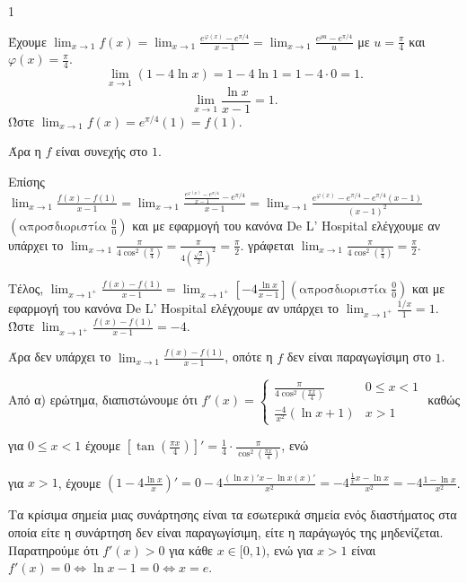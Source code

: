 \begin{ylh}{1}
    \item [Ύλη από εικόνα]
\end{ylh}

\begin{alist}
\item Έχουμε $\lim_{x \to 1} f(x) = \lim_{x \to 1} \frac{e^{\varphi(x)} - e^{\pi/4}}{x-1} = \lim_{x \to 1} \frac{e^{\rho u} - e^{\pi/4}}{u}$ με $u = \frac{\pi}{4}$ και $\varphi(x) = \frac{\pi}{4}$.
\[
\lim_{x \to 1} (1-4\ln x) = 1-4\ln 1 = 1-4\cdot 0 = 1.
\]
\[
\lim_{x \to 1} \frac{\ln x}{x-1} = 1.
\]
Ώστε $\lim_{x \to 1} f(x) = e^{\pi/4} (1) = f(1)$.

Άρα η $f$ είναι συνεχής στο $1$.

Επίσης $\lim_{x \to 1} \frac{f(x)-f(1)}{x-1} = \lim_{x \to 1} \frac{\frac{e^{\varphi(x)}-e^{\pi/4}}{x-1} - e^{\pi/4}}{x-1} = \lim_{x \to 1} \frac{e^{\varphi(x)}-e^{\pi/4} - e^{\pi/4}(x-1)}{(x-1)^2}$
$\left( \text{απροσδιοριστία } \frac{0}{0} \right)$ και με εφαρμογή του κανόνα De L' Hospital ελέγχουμε αν υπάρχει το $\lim_{x \to 1} \frac{\pi}{4 \cos^2 (\frac{\pi}{4})} = \frac{\pi}{4 (\frac{\sqrt{2}}{2})^2} = \frac{\pi}{2}$.
γράφεται $\lim_{x \to 1} \frac{\pi}{4 \cos^2 (\frac{\pi}{4})} = \frac{\pi}{2}$.

Τέλος, $\lim_{x \to 1^+} \frac{f(x)-f(1)}{x-1} = \lim_{x \to 1^+} \left[ -4 \frac{\ln x}{x-1} \right] (\text{απροσδιοριστία } \frac{0}{0})$ και με εφαρμογή του κανόνα De L' Hospital ελέγχουμε αν υπάρχει το $\lim_{x \to 1^+} \frac{1/x}{1} = 1$.
Ώστε $\lim_{x \to 1^+} \frac{f(x)-f(1)}{x-1} = -4$.

Άρα δεν υπάρχει το $\lim_{x \to 1} \frac{f(x)-f(1)}{x-1}$, οπότε η $f$ δεν είναι παραγωγίσιμη στο $1$.

\item Από α) ερώτημα, διαπιστώνουμε ότι $f'(x) = \begin{cases} \frac{\pi}{4 \cos^2 (\frac{\pi x}{4})} & 0 \leq x < 1 \\ \frac{-4}{x^2} (\ln x + 1) & x > 1 \end{cases}$ καθώς

για $0 \leq x < 1$ έχουμε $\left[ \tan \left( \frac{\pi x}{4} \right) \right]' = \frac{1}{4} \cdot \frac{\pi}{\cos^2 (\frac{\pi x}{4})}$, ενώ

για $x > 1$, έχουμε $(1-4\frac{\ln x}{x})' = 0 - 4 \frac{(\ln x)' x - \ln x (x)'}{x^2} = -4 \frac{\frac{1}{x} x - \ln x}{x^2} = -4 \frac{1-\ln x}{x^2}$.

Τα κρίσιμα σημεία μιας συνάρτησης είναι τα εσωτερικά σημεία ενός διαστήματος στα οποία είτε η συνάρτηση δεν είναι παραγωγίσιμη, είτε η παράγωγός της μηδενίζεται.
Παρατηρούμε ότι $f'(x) > 0$ για κάθε $x \in [0,1)$, ενώ για $x > 1$ είναι $f'(x) = 0 \Leftrightarrow \ln x - 1 = 0 \Leftrightarrow x = e$.


\end{alist}
